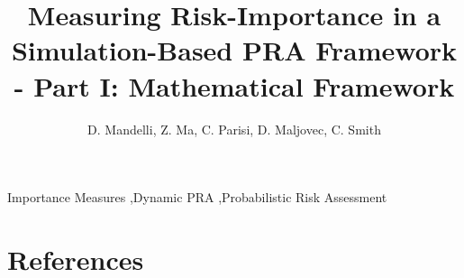 \documentclass{elsarticle}
\begin{document}
\begin{frontmatter}

\title{Measuring Risk-Importance in a Simulation-Based PRA Framework - 
       Part I: Mathematical Framework}

\author{D. Mandelli, Z. Ma, C. Parisi, D. Maljovec, C. Smith}
\address{Idaho National Laboratory (INL), 2525 Fremont Ave, 83402 Idaho Falls (ID), USA}

\begin{abstract}
  
\end{abstract}

\begin{keyword}
Importance Measures \sep Dynamic PRA \sep Probabilistic Risk Assessment 
\end{keyword}

\end{frontmatter}

\linenumbers

\printnomenclature[1in]












\section*{References}


\end{document}
